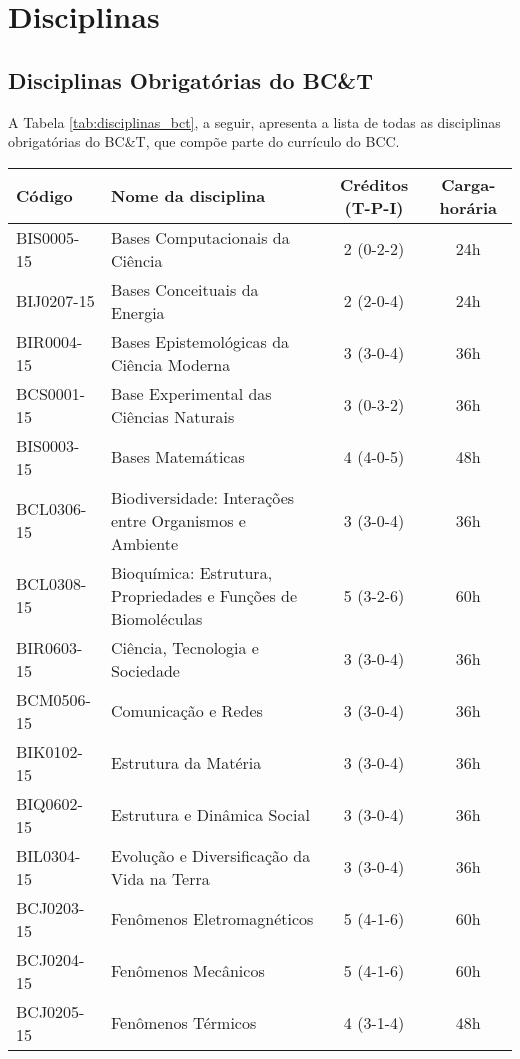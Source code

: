 \section {Disciplinas}

\subsection{Disciplinas Obrigatórias do BC\&T}
A Tabela \ref{tab:disciplinas_bct}, a seguir, apresenta a lista de todas as disciplinas obrigatórias do BC\&T, que compõe parte do currículo do BCC.

\begin{table}[!h]
	\begin{longtable}{|l|p{}|c|c|}
		\hline
		Código & Nome da disciplina & Créditos (T-P-I) & Carga-horária\\
		\hline\hline
		BIS0005-15 & Bases Computacionais da Ciência & 2 (0-2-2) & 24h\\
		\hline
		BIJ0207-15 & Bases Conceituais da Energia & 2 (2-0-4) & 24h\\
		\hline
		BIR0004-15 & Bases Epistemológicas da Ciência Moderna & 3 (3-0-4) & 36h\\
		\hline
		BCS0001-15 & Base Experimental das Ciências Naturais & 3 (0-3-2) & 36h\\
		\hline
		BIS0003-15 & Bases Matemáticas & 4 (4-0-5) & 48h\\
		\hline
		BCL0306-15 & Biodiversidade: Interações entre Organismos e Ambiente & 3 (3-0-4) & 36h\\
		\hline
		BCL0308-15 & Bioquímica: Estrutura, Propriedades e Funções de Biomoléculas & 5 (3-2-6) & 60h\\
		\hline
		BIR0603-15 & Ciência, Tecnologia e Sociedade & 3 (3-0-4) & 36h\\
		\hline
		BCM0506-15 & Comunicação e Redes & 3 (3-0-4) & 36h\\
		\hline
		BIK0102-15 & Estrutura da Matéria & 3 (3-0-4) & 36h\\
		\hline
		BIQ0602-15 & Estrutura e Dinâmica Social & 3 (3-0-4) & 36h \\
		\hline
		BIL0304-15 & Evolução e Diversificação da Vida na Terra & 3 (3-0-4) & 36h\\
		\hline
		BCJ0203-15 & Fenômenos Eletromagnéticos & 5 (4-1-6) & 60h\\
		\hline
		BCJ0204-15 & Fenômenos Mecânicos & 5 (4-1-6) & 60h \\
		\hline
		BCJ0205-15 & Fenômenos Térmicos & 4 (3-1-4) & 48h\\

\end{longtable}
\end{table}
